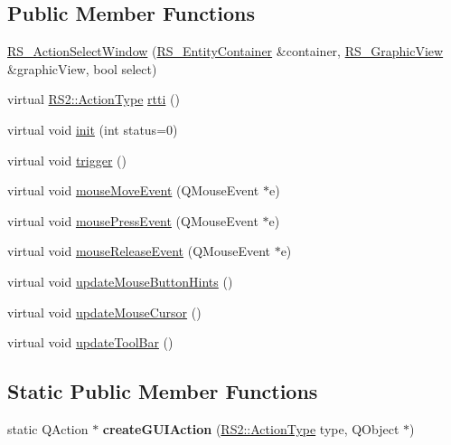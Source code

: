 \subsection*{Public Member Functions}
\begin{DoxyCompactItemize}
\item 
\hyperlink{classRS__ActionSelectWindow_a4c403a41350eb20d138ecea1528b06b4}{R\-S\-\_\-\-Action\-Select\-Window} (\hyperlink{classRS__EntityContainer}{R\-S\-\_\-\-Entity\-Container} \&container, \hyperlink{classRS__GraphicView}{R\-S\-\_\-\-Graphic\-View} \&graphic\-View, bool select)
\item 
virtual \hyperlink{classRS2_afe3523e0bc41fd637b892321cfc4b9d7}{R\-S2\-::\-Action\-Type} \hyperlink{classRS__ActionSelectWindow_af889f062c75ab7cd08c68427730fbe55}{rtti} ()
\item 
virtual void \hyperlink{classRS__ActionSelectWindow_a8442ec1fc4aade7e9a3071304a76268d}{init} (int status=0)
\item 
virtual void \hyperlink{classRS__ActionSelectWindow_a78078d101937451ad89b382b80c12630}{trigger} ()
\item 
virtual void \hyperlink{classRS__ActionSelectWindow_aacb4107d2fa2a94d543bce72aec4ce98}{mouse\-Move\-Event} (Q\-Mouse\-Event $\ast$e)
\item 
virtual void \hyperlink{classRS__ActionSelectWindow_a4011e39cc16f5fcb42146f65e0a32910}{mouse\-Press\-Event} (Q\-Mouse\-Event $\ast$e)
\item 
virtual void \hyperlink{classRS__ActionSelectWindow_a12c9035476b14683ac40ebc9bd0e58bc}{mouse\-Release\-Event} (Q\-Mouse\-Event $\ast$e)
\item 
virtual void \hyperlink{classRS__ActionSelectWindow_ab3128755efea441cda617f4a7a3fd264}{update\-Mouse\-Button\-Hints} ()
\item 
virtual void \hyperlink{classRS__ActionSelectWindow_ac9f63e791ae185f9f5b90d726a53f7b8}{update\-Mouse\-Cursor} ()
\item 
virtual void \hyperlink{classRS__ActionSelectWindow_ad3f126993e9fef2c5aba7a267e75f304}{update\-Tool\-Bar} ()
\end{DoxyCompactItemize}
\subsection*{Static Public Member Functions}
\begin{DoxyCompactItemize}
\item 
\hypertarget{classRS__ActionSelectWindow_ac7af28ed4e431b88a959a8acbc938a5a}{static Q\-Action $\ast$ {\bfseries create\-G\-U\-I\-Action} (\hyperlink{classRS2_afe3523e0bc41fd637b892321cfc4b9d7}{R\-S2\-::\-Action\-Type} type, Q\-Object $\ast$)}\label{classRS__ActionSelectWindow_ac7af28ed4e431b88a959a8acbc938a5a}

\end{DoxyCompactItemize}

